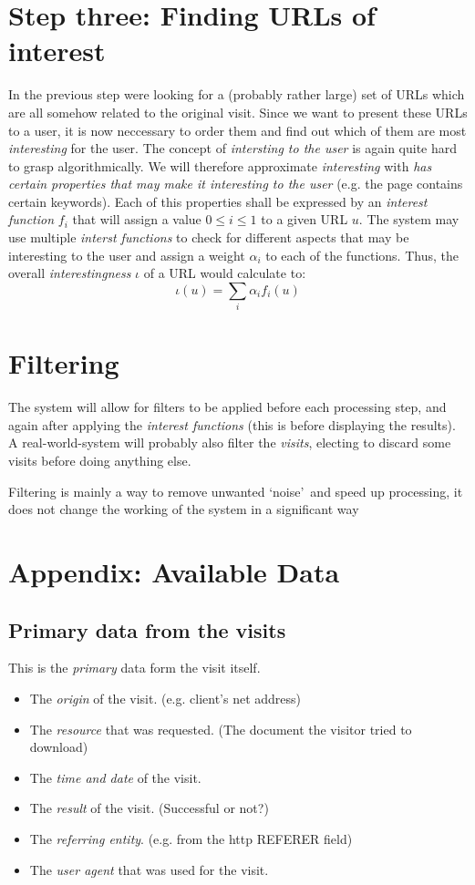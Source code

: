 \documentclass[a4paper]{danarticle}
\begin{document}
  \section*{Step three: Finding URLs of interest}
    In the previous step were looking for a (probably rather large)
    set of URLs which are all somehow related to the original visit.
    Since we want to present these URLs to a user, it is now 
    neccessary to order them and find out which of them are most
    \textit{interesting} for the user. 
    The concept of \textit{intersting to the user} is again quite 
    hard to grasp algorithmically. We will therefore
    approximate \textit{interesting} with \textit{has certain
    properties that may make it interesting to the user} (e.g.
    the page contains certain keywords). Each of this properties
    shall be expressed by an \textit{interest function} $ f_i $ 
    that will assign a value $ 0 \leq i \leq 1 $ to a given URL
    $ u $. The system may use multiple \textit{interst functions}
    to check for different aspects that may be interesting
    to the user and assign a weight $ \alpha_{i} $ to each 
    of the functions. Thus, the overall \textit{interestingness}
    $ \iota $ of a URL would calculate to:
    \[
      \iota(u) = \sum_i \alpha_i f_i(u)
    \]
  
  \section*{Filtering}
    The system will allow for filters to be applied before each
    processing step, and again after applying the 
    \textit{interest functions} (this is before displaying the
    results). A real-world-system will probably also filter 
    the \textit{visits}, electing to discard some visits before
    doing anything else.
    
    Filtering is mainly a way to remove unwanted \lq noise\rq\ and
    speed up processing, it does not change the working of the
    system in a significant way
  \newpage
  \section*{Appendix: Available Data}
  \subsection*{Primary data from the visits}
    This is the \textit{primary} data form the visit itself.
    \begin{itemize}
    	\item{The \textit{origin} of the visit. (e.g.
    	      client's net address)}
    	\item{The \textit{resource} that was requested. (The document
    	      the visitor tried to download)}
    	\item{The \textit{time and date} of the visit.}
    	\item{The \textit{result} of the visit. (Successful or not?)}
    	\item{The \textit{referring entity}. (e.g. from the http REFERER field)}
    	\item{The \textit{user agent} that was used for the visit.}
    \end{itemize}
\end{document}
